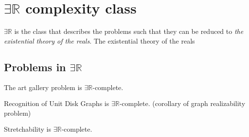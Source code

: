 \section{$\exists \mathbb{R}$ complexity class}

$\exists \mathbb{R}$ is the class that describes the problems such that they can be reduced to \textit{the existential theory of the reals}\cite{ExistentialTheoryReals2006}. The existential theory of the reals

\subsection{Problems in $\exists \mathbb{R}$}

The art gallery problem is $\exists \mathbb{R}$-complete.\cite{abrahamsenArtGalleryProblem2017}

Recognition of Unit Disk Graphs is $\exists \mathbb{R}$-complete. (corollary of graph realizability problem)\cite{Schaefer2013}

Stretchability is $\exists \mathbb{R}$-complete.
